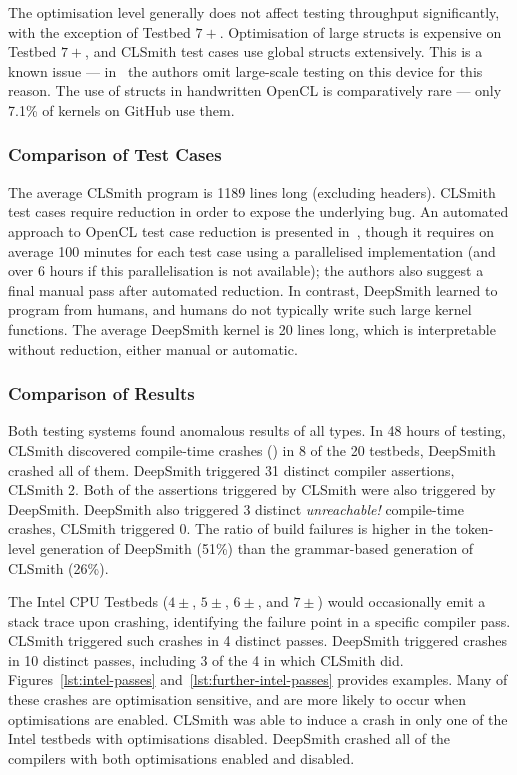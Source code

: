 The optimisation level generally does not affect testing throughput
significantly, with the exception of Testbed $7+$. Optimisation of large structs
is expensive on Testbed $7+$, and CLSmith test cases use global structs
extensively. This is a known issue --- in~\cite{Lidbury2015a} the authors omit
large-scale testing on this device for this reason. The use of structs in
handwritten OpenCL is comparatively rare --- only 7.1\% of kernels on GitHub use
them.


\subsubsection{Comparison of Test Cases} %

The average CLSmith program is 1189 lines long (excluding headers). CLSmith test
cases require reduction in order to expose the underlying bug. An automated
approach to OpenCL test case reduction is presented in~\cite{Pflanzer2016},
though it requires on average 100 minutes for each test case using a
parallelised implementation (and over 6 hours if this parallelisation is not
available); the authors also suggest a final manual pass after automated
reduction. In contrast, DeepSmith learned to program from humans, and humans do
not typically write such large kernel functions. The average DeepSmith kernel is
20 lines long, which is interpretable without reduction, either manual or
automatic.


\subsubsection{Comparison of Results} %

Both testing systems found anomalous results of all types. In 48 hours of testing, CLSmith discovered compile-time crashes (\bc) in 8 of the 20 testbeds, DeepSmith crashed all of them. DeepSmith triggered 31 distinct compiler assertions, CLSmith 2. Both of the assertions triggered by CLSmith were also triggered by DeepSmith. DeepSmith also triggered 3 distinct \emph{unreachable!} compile-time crashes, CLSmith triggered 0. The ratio of build failures is higher in the token-level generation of DeepSmith (51\%) than the grammar-based generation of CLSmith (26\%).

The Intel CPU Testbeds ($4\pm$, $5\pm$, $6\pm$, and $7\pm$) would occasionally emit a stack trace upon crashing, identifying the failure point in a specific compiler pass. CLSmith triggered such crashes in 4 distinct passes. DeepSmith triggered crashes in 10 distinct passes, including 3 of the 4 in which CLSmith did. Figures~\ref{lst:intel-passes} and~\ref{lst:further-intel-passes} provides examples. Many of these crashes are optimisation sensitive, and are more likely to occur when optimisations are enabled. CLSmith was able to induce a crash in only one of the Intel testbeds with optimisations disabled. DeepSmith crashed all of the compilers with both optimisations enabled and disabled.


